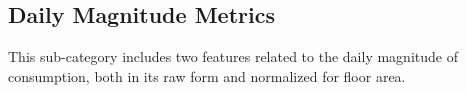 \subsection{Daily Magnitude Metrics}

This sub-category includes two features related to the daily magnitude of consumption, both in its raw form and normalized for floor area.